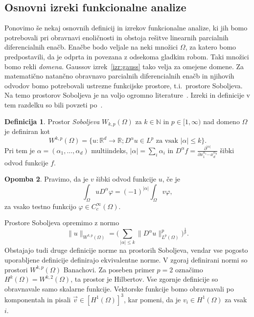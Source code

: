 \documentclass[12pt,a4paper,twoside]{article}
\theoremstyle{definition} %
\newtheorem{definicija}{Definicija}[section]
\newtheorem{opomba}[definicija]{Opomba}
\theoremstyle{plain} %
\numberwithin{equation}{section}
\newcommand{\R}{\mathbb R}
\newcommand{\N}{\mathbb N}
\renewcommand{\phi}{\varphi}
\newcommand{\dpar}[2]{\ensuremath{\frac{\partial #1}{\partial #2}}}
\newcommand{\vv}{\vec{v}}
\begin{document}
\subsection{Osnovni izreki funkcionalne analize}

Ponovimo še nekaj osnovnih definicij in izrekov funkcionalne analize, ki jih bomo potrebovali pri
obravnavi enoličnosti in obstoja rešitve linearnih parcialnih diferencialnih enačb. Enačbe bodo
veljale na neki množici $\Omega$, za katero bomo predpostavili, da je odprta in povezana z odsekoma
gladkim robom. Taki množici bomo rekli \emph{domena}. Gaussov izrek~\ref{izr:gauss} tako velja za
omejene domene. Za matematično natančno obravnavo parcialnih diferencialnih enačb in njihovih
odvodov bomo potrebovali ustrezne funkcijske prostore, t.i.~prostore Soboljeva. Na temo prostorov
Soboljeva je na voljo ogromno
literature~\cite{adams2003sobolev,di2012hitchhiker,saposnikova2013sobolev}. Izreki in definicije v
tem razdelku so bili povzeti po~\cite{adams2003sobolev}.

\begin{definicija}
  Prostor \emph{Soboljeva} $W_{k,p}(\Omega)$ za $k \in \N$ in $p \in [1,
  \infty)$ nad domeno $\Omega$ je definiran kot
  \begin{equation}
     W^{k,p}(\Omega) = \{u\colon\R^d\to\R; D^\alpha u \in L^p \text{ za vsak } |\alpha| \leq k \}.
  \end{equation}
  Pri tem je $\alpha = (\alpha_1, \dots, \alpha_d)$ multiindeks, $|\alpha| =
  \sum_i\alpha_i$ in $D^\alpha f = \dpar{^{|\alpha|}}{x_1^{\alpha_1}\cdots
  x_d^{\alpha_d}}$ šibki odvod funkcije $f$.
\end{definicija}
\begin{opomba}
  Pravimo, da je $v$ šibki odvod funkcije $u$, če je
  \begin{equation}
    \int_\Omega u D^\alpha\phi = (-1)^{|\alpha|}\int_\Omega v \phi,
  \end{equation}
  za vsako testno funkcijo $\phi \in C^\infty_c(\Omega)$.
\end{opomba}

Prostore Soboljeva opremimo z normo
\begin{equation}
   \|u\|_{W^{k,p}(\Omega)} = \Big(\sum_{|\alpha| \leq k} \|D^\alpha u\|_{L^p(\Omega)}^p\Big)^\frac1p.
\end{equation}
Obstajajo tudi druge definicije norme na prostorih Soboljeva, vendar vse pogosto uporabljene
definicije definirajo ekvivalentne norme. V zgoraj definirani normi so prostori
$W^{k,p}(\Omega)$ Banachovi. Za poseben primer $p = 2$ označimo $H^k(\Omega) =
W^{k,2}(\Omega)$, ta prostor je Hilbertov.
Vse zgornje definicije so obravnavale samo skalarne funkcije.
Vektorske funkcije bomo obravnavali po komponentah in pisali
$\vv \in [H^1(\Omega)]^3$, kar pomeni, da je $v_i \in H^1(\Omega)$ za vsak $i$.
\end{document}
